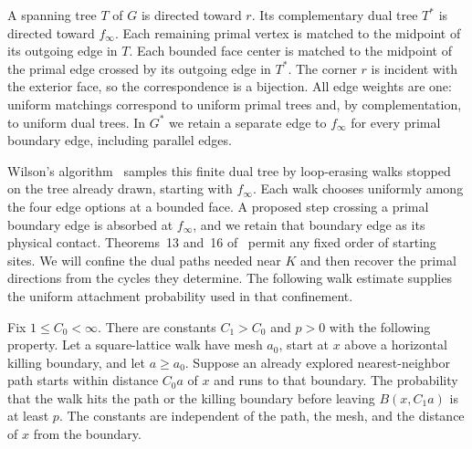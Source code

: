 A spanning tree $T$ of $G$ is directed toward $r$. Its complementary
dual tree $T^*$ is directed toward $f_\infty$. Each remaining primal
vertex is matched to the midpoint of its outgoing edge in $T$.
Each bounded face center is matched to the midpoint of the primal
edge crossed by its outgoing edge in $T^*$. The corner $r$ is incident
with the exterior face, so the
correspondence is a bijection. All edge weights are one: uniform
matchings correspond to uniform primal trees and, by complementation,
to uniform dual trees. In $G^*$ we retain a separate edge to
$f_\infty$ for every primal boundary edge, including parallel edges.

Wilson's algorithm~\cite{Wilson,PW} samples this finite dual tree by
loop-erasing walks stopped on the tree already drawn, starting with
$f_\infty$. Each walk chooses uniformly among the four edge options at
a bounded face. A proposed step crossing a primal boundary edge is
absorbed at $f_\infty$, and we retain that boundary edge as its physical
contact. Theorems~13 and~16 of~\cite{PW} permit any fixed order of
starting sites. We will confine the dual paths needed near $K$ and
then recover the primal directions from the cycles they determine.
The following walk estimate supplies the uniform attachment
probability used in that confinement.

\begin{lemma}
\label{lem:walk-attachment}
Fix $1\le C_0<\infty$.  There are constants $C_1>C_0$ and $p>0$ with the
following property.  Let a square-lattice walk have mesh $a_0$, start at
$x$ above a horizontal killing boundary, and let $a\ge a_0$.
Suppose an already explored nearest-neighbor path starts within distance
$C_0a$ of $x$ and runs to that boundary.  The probability that the walk
hits the path or the killing boundary before leaving $B(x,C_1a)$ is at
least $p$.  The constants are independent of the path, the mesh, and
the distance of $x$ from the boundary.
\end{lemma}

